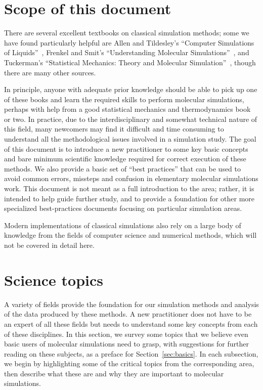 \documentclass[9pt,bestpractices]{livecoms}
\begin{document}
\section{Scope of this document}
\label{sec:scope}

There are several excellent textbooks on classical simulation methods; some we have found particularly helpful are Allen and Tildesley's ``Computer Simulations of Liquids''~\cite{allen_computer_2017}, Frenkel and Smit's ``Understanding Molecular Simulations''~\cite{Frenkel:2001:}, and Tuckerman's ``Statistical Mechanics: Theory and Molecular Simulation''~\cite{Tuckerman:2010:}, though there are many other sources.

In principle, anyone with adequate prior knowledge should be able to pick up one of these books and learn the required skills to perform molecular simulations, perhaps with help from a good statistical mechanics and thermodynamics book or two.
In practice, due to the interdisciplinary and somewhat technical nature of this field, many newcomers may find it difficult and time consuming to understand all the methodological issues involved in a simulation study.  
The goal of this document is to introduce a new practitioner to some key basic concepts and bare minimum scientific knowledge required for correct execution of these methods. 
We also provide a basic set of ``best practices'' that can be used to avoid common errors, missteps and confusion in elementary molecular simulations work.
This document is not meant as a full introduction to the area; rather, it is intended to help guide further study, and to provide a foundation for other more specialized best-practices documents focusing on particular simulation areas.

Modern implementations of classical simulations also rely on a large body of knowledge from the fields of computer science and numerical methods, which will
not be covered in detail here.


\section{Science topics}
\label{sec:science}
A variety of fields provide the foundation for our simulation methods and analysis of the data produced by these methods.
A new practitioner does not have to be an expert of all these fields but needs to understand some key concepts from each of these disciplines.
In this section, we survey some topics that we believe even basic users of molecular simulations need to grasp, with suggestions for further reading on these subjects, as a preface for Section~\ref{sec:basics}.
In each subsection, we begin by highlighting some of the critical topics from the corresponding area, then describe what these are and why they are important to molecular simulations.
\end{document}
